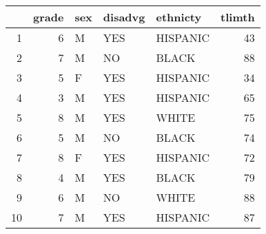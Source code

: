 % 
\begin{tabular}{rrlllr}
  \hline
 & grade & sex & disadvg & ethnicty & tlimth \\ 
  \hline
1 &   6 & M & YES & HISPANIC &  43 \\ 
  2 &   7 & M & NO & BLACK &  88 \\ 
  3 &   5 & F & YES & HISPANIC &  34 \\ 
  4 &   3 & M & YES & HISPANIC &  65 \\ 
  5 &   8 & M & YES & WHITE &  75 \\ 
  6 &   5 & M & NO & BLACK &  74 \\ 
  7 &   8 & F & YES & HISPANIC &  72 \\ 
  8 &   4 & M & YES & BLACK &  79 \\ 
  9 &   6 & M & NO & WHITE &  88 \\ 
  10 &   7 & M & YES & HISPANIC &  87 \\ 
   \hline
\end{tabular}
